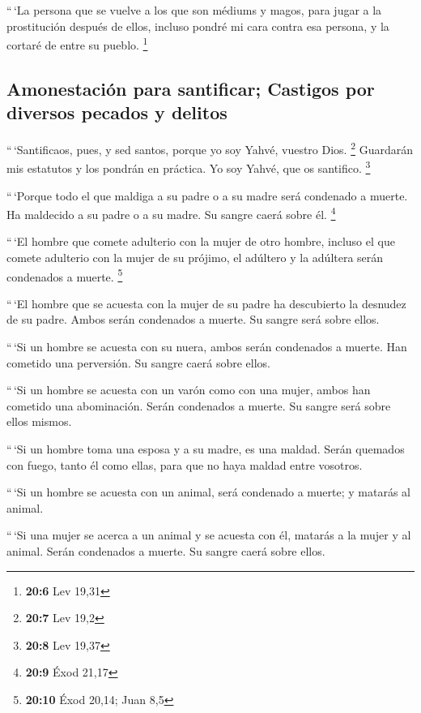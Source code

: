 \begin{paracol}{2}
 ``\,`La persona que se vuelve a los que son médiums y
magos, para jugar a la prostitución después de ellos, incluso pondré mi
cara contra esa persona, y la cortaré de entre su pueblo. \footnote{\textbf{20:6}
  Lev 19,31}

\hypertarget{amonestaciuxf3n-para-santificar-castigos-por-diversos-pecados-y-delitos}{%
\subsection{Amonestación para santificar; Castigos por diversos pecados
y
delitos}\label{amonestaciuxf3n-para-santificar-castigos-por-diversos-pecados-y-delitos}}

 ``\,`Santificaos, pues, y sed santos, porque yo soy
Yahvé, vuestro Dios. \footnote{\textbf{20:7} Lev 19,2} 
Guardarán mis estatutos y los pondrán en práctica. Yo soy Yahvé, que os
santifico. \footnote{\textbf{20:8} Lev 19,37}

 ``\,`Porque todo el que maldiga a su padre o a su madre
será condenado a muerte. Ha maldecido a su padre o a su madre. Su sangre
caerá sobre él. \footnote{\textbf{20:9} Éxod 21,17}

 ``\,`El hombre que comete adulterio con la mujer de otro
hombre, incluso el que comete adulterio con la mujer de su prójimo, el
adúltero y la adúltera serán condenados a muerte. \footnote{\textbf{20:10}
  Éxod 20,14; Juan 8,5}

 ``\,`El hombre que se acuesta con la mujer de su padre
ha descubierto la desnudez de su padre. Ambos serán condenados a muerte.
Su sangre será sobre ellos.

 ``\,`Si un hombre se acuesta con su nuera, ambos serán
condenados a muerte. Han cometido una perversión. Su sangre caerá sobre
ellos.

 ``\,`Si un hombre se acuesta con un varón como con una
mujer, ambos han cometido una abominación. Serán condenados a muerte. Su
sangre será sobre ellos mismos.

 ``\,`Si un hombre toma una esposa y a su madre, es una
maldad. Serán quemados con fuego, tanto él como ellas, para que no haya
maldad entre vosotros.

 ``\,`Si un hombre se acuesta con un animal, será
condenado a muerte; y matarás al animal.

 ``\,`Si una mujer se acerca a un animal y se acuesta con
él, matarás a la mujer y al animal. Serán condenados a muerte. Su sangre
caerá sobre ellos.


\end{paracol}

